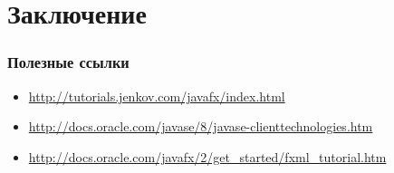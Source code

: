 \documentclass[xetex,mathserif,serif]{beamer}
\begin{document}
	\section{Заключение}

	\begin{frame}
		\frametitle{Полезные ссылки}
		\begin{itemize}
			\item \url{http://tutorials.jenkov.com/javafx/index.html}
			\item \url{http://docs.oracle.com/javase/8/javase-clienttechnologies.htm}
			\item \url{http://docs.oracle.com/javafx/2/get_started/fxml_tutorial.htm}
		\end{itemize}
	\end{frame}
\end{document}
